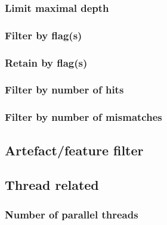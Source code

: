 \documentclass[10pt,a4paper,final]{article}
\begin{document}
\subsubsection{Limit maximal depth}

\subsubsection{Filter by flag(s)}\label{sec:filter_flag}

\subsubsection{Retain by flag(s)}



\subsubsection{Filter by number of hits}



\subsubsection{Filter by number of mismatches}



\subsection{Artefact/feature filter}\label{sec:cli_artefact_filter}

\subsection{Thread related}
\subsubsection{Number of parallel threads}

\end{document}
